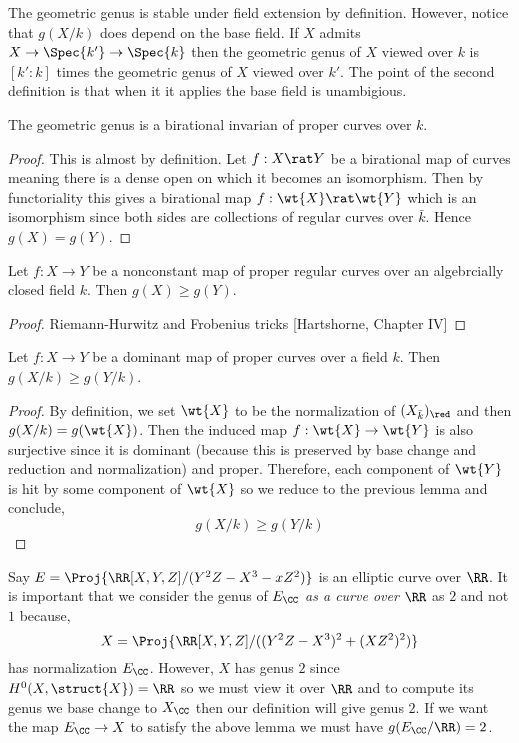 \documentclass[12pt]{article}
\begin{document}
\begin{rmk}
The geometric genus is stable under field extension by definition. However, notice that $g(X/k)$ does depend on the base field. If $X$ admits $X \to \Spec{k'} \to \Spec{k}$ then the geometric genus of $X$ viewed over $k$ is $[k' : k]$ times the geometric genus of $X$ viewed over $k'$. The point of the second definition is that when it it applies the base field is unambigious.
\end{rmk}

\begin{prop}
The geometric genus is a birational invarian of proper curves over $k$.
\end{prop}

\begin{proof}
This is almost by definition. Let $f : X \rat Y$ be a birational map of curves meaning there is a dense open on which it becomes an isomorphism. Then by functoriality this gives a birational map $f : \wt{X} \rat \wt{Y}$ which is an isomorphism since both sides are collections of regular curves over $\bar{k}$. Hence $g(X) = g(Y)$.
\end{proof}

\begin{lemma}
Let $f : X \to Y$ be a nonconstant map of proper regular curves over an algebrcially closed field $k$. Then $g(X) \ge g(Y)$.
\end{lemma}

\begin{proof}
Riemann-Hurwitz and Frobenius tricks [Hartshorne, Chapter IV]
\end{proof}

\begin{prop}
Let $f : X \to Y$ be a dominant map of proper curves over a field $k$. Then $g(X/k) \ge g(Y/k)$.
\end{prop}

\begin{proof}
By definition, we set $\wt{X}$ to be the normalization of $(X_{\bar{k}})_{\red}$ and then $g(X/k) = g(\wt{X})$. Then the induced map $f : \wt{X} \to \wt{Y}$ is also surjective since it is dominant (because this is preserved by base change and reduction and normalization) and proper. Therefore, each component of $\wt{Y}$ is hit by some component of $\wt{X}$ so we reduce to the previous lemma and conclude,
\[ g(X/k) \ge g(Y/k) \]
\end{proof}

\begin{example}
Say $E = \Proj{\RR[X,Y,Z]/(Y^2 Z - X^3 - x Z^2)}$ is an elliptic curve over $\RR$. It is important that we consider the genus of $E_{\CC}$ \textit{as a curve over $\RR$} as $2$ and not $1$ because,
\[ X = \Proj{\RR[X,Y,Z]/((Y^2 Z - X^3)^2 + (XZ^2)^2)} \]
has normalization $E_{\CC}$. However, $X$ has genus $2$ since $H^0(X, \struct{X}) = \RR$ so we must view it over $\RR$ and to compute its genus we base change to $X_{\CC}$ then our definition will give genus $2$. If we want the map $E_{\CC} \to X$ to satisfy the above lemma we must have $g(E_{\CC} / \RR) = 2$. 
\end{example}
\end{document}
